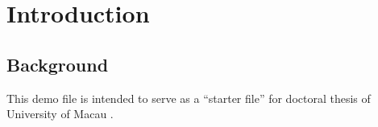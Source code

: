\chapter{Introduction}
\label{ch1_intro} 

\section{Background}

This demo file is intended to serve as a “starter file” for doctoral thesis of University of Macau \cite{lamport1994latex}.

